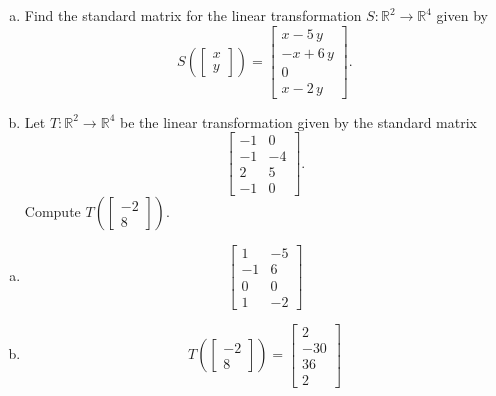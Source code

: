 
\begin{exerciseStatement}

\begin{enumerate}[(a)]
\item Find the standard matrix for the linear transformation \(S:\mathbb{R}^ 2  \to \mathbb{R}^ 4 \) given by \[S\left(  \left[\begin{array}{c}
x \\
y
\end{array}\right]  \right) =  \left[\begin{array}{c}
x - 5 \, y \\
-x + 6 \, y \\
0 \\
x - 2 \, y
\end{array}\right] .\]
\item Let \(T:\mathbb{R}^ 2  \to \mathbb{R}^ 4 \) be the linear transformation given by the standard matrix \[ \left[\begin{array}{cc}
-1 & 0 \\
-1 & -4 \\
2 & 5 \\
-1 & 0
\end{array}\right] .\] Compute \(T\left( \left[\begin{array}{c}
-2 \\
8
\end{array}\right]  \right)\). 
\end{enumerate}
    
\end{exerciseStatement}
    
\begin{exerciseAnswer} 

\begin{enumerate}[(a)]
\item \[ \left[\begin{array}{cc}
1 & -5 \\
-1 & 6 \\
0 & 0 \\
1 & -2
\end{array}\right] \]
\item \[T\left( \left[\begin{array}{c}
-2 \\
8
\end{array}\right]  \right)= \left[\begin{array}{c}
2 \\
-30 \\
36 \\
2
\end{array}\right] \]
\end{enumerate}
    
\end{exerciseAnswer}
    
